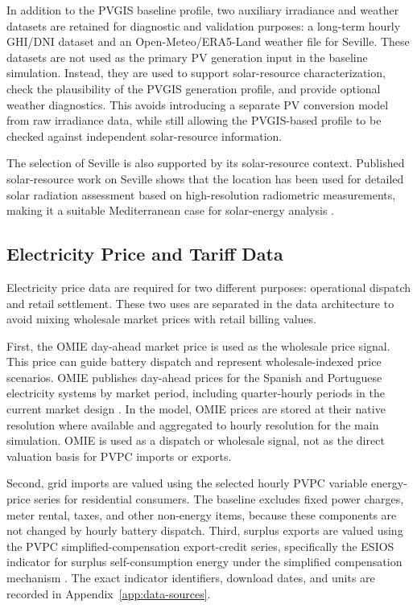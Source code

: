 In addition to the PVGIS baseline profile, two auxiliary irradiance and weather datasets are retained for diagnostic and validation purposes: a long-term hourly GHI/DNI dataset and an Open-Meteo/ERA5-Land weather file for Seville. These datasets are not used as the primary PV generation input in the baseline simulation. Instead, they are used to support solar-resource characterization, check the plausibility of the PVGIS generation profile, and provide optional weather diagnostics. This avoids introducing a separate PV conversion model from raw irradiance data, while still allowing the PVGIS-based profile to be checked against independent solar-resource information.

The selection of Seville is also supported by its solar-resource context. Published solar-resource work on Seville shows that the location has been used for detailed solar radiation assessment based on high-resolution radiometric measurements, making it a suitable Mediterranean case for solar-energy analysis \cite{s2016s}.

\subsection{Electricity Price and Tariff Data}
\label{sec:electricity_price_tariff_data}

Electricity price data are required for two different purposes: operational dispatch and retail settlement. These two uses are separated in the data architecture to avoid mixing wholesale market prices with retail billing values.

First, the OMIE day-ahead market price is used as the wholesale price signal. This price can guide battery dispatch and represent wholesale-indexed price scenarios. OMIE publishes day-ahead prices for the Spanish and Portuguese electricity systems by market period, including quarter-hourly periods in the current market design \cite{omiendday}. In the model, OMIE prices are stored at their native resolution where available and aggregated to hourly resolution for the main simulation. OMIE is used as a dispatch or wholesale signal, not as the direct valuation basis for PVPC imports or exports.

Second, grid imports are valued using the selected hourly PVPC variable energy-price series for residential consumers. The baseline excludes fixed power charges, meter rental, taxes, and other non-energy items, because these components are not changed by hourly battery dispatch. Third, surplus exports are valued using the PVPC simplified-compensation export-credit series, specifically the ESIOS indicator for surplus self-consumption energy under the simplified compensation mechanism \cite{reendprecio}. The exact indicator identifiers, download dates, and units are recorded in Appendix~\ref{app:data-sources}.

